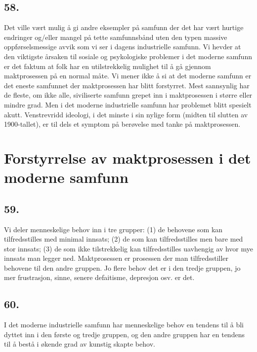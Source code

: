 \documentclass[oneside]{book}
\begin{document}
\section*{58.}
Det ville vært mulig å gi andre eksempler på samfunn der det har vært hurtige
endringer og/eller mangel på tette samfunnsbånd uten den typen massive
oppførselsmessige avvik som vi ser i dagens industrielle samfunn. Vi hevder at
den viktigste årsaken til sosiale og psykologiske problemer i det moderne
samfunn er det faktum at folk har en utilstrekkelig mulighet til å gå gjennom
maktprosessen på en normal måte. Vi mener ikke å si at det moderne samfunn er
det eneste samfunnet der maktprosessen har blitt forstyrret. Mest sannsynlig
har de fleste, om ikke alle, siviliserte samfunn grepet inn i maktprosessen i
større eller mindre grad. Men i det moderne industrielle samfunn har problemet
blitt spesielt akutt. Venstrevridd ideologi, i det minste i sin nylige form
(midten til slutten av 1900-tallet), er til dels et symptom på berøvelse med
tanke på maktprosessen.

\chapter{Forstyrrelse av maktprosessen i det moderne samfunn}
\section*{59.}
Vi deler menneskelige behov inn i tre grupper: (1) de behovene som kan
tilfredsstilles med minimal innsats; (2) de som kan tilfredsstilles men bare
med stor innsats; (3) de som ikke tilstrekkelig kan tilfredsstilles uavhengig
av hvor mye innsats man legger ned. Maktprosessen er prosessen der man
tilfredsstiller behovene til den andre gruppen. Jo flere behov det er i den
tredje gruppen, jo mer frustrasjon, sinne, senere defaitisme, depresjon osv.
er det.

\section*{60.}
I det moderne industrielle samfunn har menneskelige behov en tendens til å bli
dyttet inn i den første og tredje gruppen, og den andre gruppen har en tendens
til å bestå i økende grad av kunstig skapte behov. 
\end{document}
